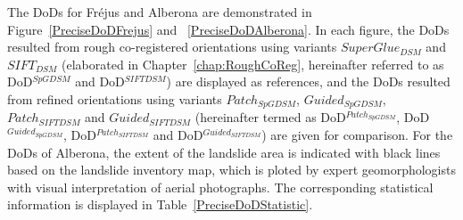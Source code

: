 
The \ac{DoD}s for Fr{\'e}jus and Alberona are demonstrated in Figure~\ref{PreciseDoDFrejus} and ~\ref{PreciseDoDAlberona}. 
In each figure, the \ac{DoD}s resulted from rough co-registered orientations using variants $SuperGlue_{DSM}$ and $SIFT_{DSM}$ (elaborated in Chapter~\ref{chap:RoughCoReg}, hereinafter referred to as DoD$^{SpGDSM}$ and DoD$^{SIFTDSM}$) are displayed as references, and the \ac{DoD}s resulted from refined orientations using variants $Patch_{SpGDSM}$, $Guided_{SpGDSM}$, $Patch_{SIFTDSM}$ and $Guided_{SIFTDSM}$ (hereinafter termed as DoD$^{Patch_{SpGDSM}}$, DoD$^{Guided_{SpGDSM}}$, DoD$^{Patch_{SIFTDSM}}$ and DoD$^{Guided_{SIFTDSM}}$) are given for comparison. 
For the \ac{DoD}s of Alberona, the extent of the landslide area is indicated with black lines based on the landslide inventory map, which is ploted by expert geomorphologists with visual interpretation of aerial photographs. 
The corresponding statistical information is displayed in Table~\ref{PreciseDoDStatistic}.\\




